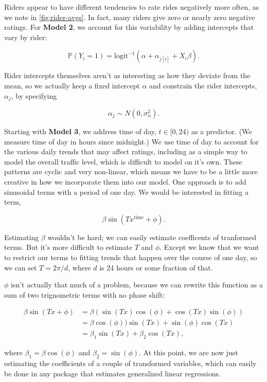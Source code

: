 \documentclass[12pt,twoside]{reedthesis}
\begin{document}
  Riders appear to have different tendencies to rate rides negatively more
  often, as we note in \autoref{fig:rider-avgs}. In fact, many riders give
  zero or nearly zero negative ratings. For \textbf{Model 2}, we account
  for this variability by adding intercepts that vary by rider:
  
  \[ \mathbb{P} (Y_i=1) = \text{logit}^{-1} (\alpha + \alpha_{j[i]} + X_i \beta).\]
  
  Rider intercepts themselves aren't as interesting as how they deviate
  from the mean, so we actually keep a fixed intercept \(\alpha\) and
  constrain the rider intercepts, \(\alpha_j\), by specifying
  
  \[\alpha_j \sim N(0, \sigma^2_\alpha).\]
  
  Starting with \textbf{Model 3}, we address time of day,
  \(t \in [0, 24)\) as a predictor. (We measure time of day in hours since
  midnight.) We use time of day to account for the various daily trends
  that may affect ratings, including as a simple way to model the overall
  traffic level, which is difficult to model on it's own. These patterns
  are cyclic and very non-linear, which means we have to be a little more
  creative in how we incorporate them into our model. One approach is to
  add sinusoidal terms with a period of one day. We would be interested in
  fitting a term,
  
  \[\beta \sin (T x^{\text{time}} + \phi).\]
  
  Estimating \(\beta\) wouldn't be hard; we can easily estimate
  coefficents of tranformed terms. But it's more difficult to estimate
  \(T\) and \(\phi\). Except we know that we want to restrict our terms to
  fitting trends that happen over the course of one day, so we can set
  \(T = 2 \pi / d\), where \(d\) is 24 hours or some fraction of that.
  
  \(\phi\) isn't actually that much of a problem, because we can rewrite
  this function as a sum of two trignometric terms with no phase shift:
  
  \begin{align*}
  \beta \sin (T x + \phi) &= 
  \beta \left( \sin (T x) \cos (\phi) + \cos (T x) \sin (\phi) \right)\\
  &= \beta \cos (\phi)) \sin (T x) + \sin (\phi) \cos (T x)\\
  &= \beta_1 \sin (T x) + \beta_2 \cos (T x),
  \end{align*}
  
  where \(\beta_1 = \beta \cos (\phi)\) and \(\beta_2 = \sin (\phi).\) At
  this point, we are now just estimating the coefficients of a couple of
  transformed variables, which can easily be done in any package that
  estimates generalized linear regressions.
  
\end{document}
